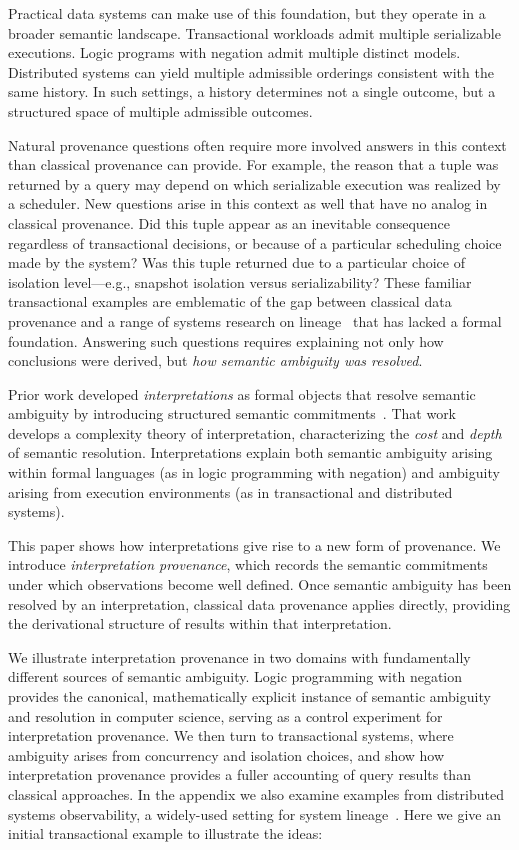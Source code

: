 \documentclass[acmsmall,nonacm]{acmart}
\theoremstyle{remark}
\numberwithin{definition}{section}
\numberwithin{theorem}{section}
\numberwithin{lemma}{section}
\numberwithin{corollary}{section}
\numberwithin{remark}{section}
\numberwithin{example}{section}
\numberwithin{observation}{section}
\numberwithin{assumption}{section}
\begin{document}
Practical data systems can make use of this foundation, but they operate in a
broader semantic landscape.
Transactional workloads admit multiple serializable executions.
Logic programs with negation admit multiple distinct models.
Distributed systems can yield multiple admissible orderings consistent with the same
history.
In such settings, a history determines not a single outcome, but a structured
space of multiple admissible outcomes.

Natural provenance questions often require more involved answers in this context
than classical provenance can provide.
For example, the reason that a tuple was
returned by a query may depend on which serializable execution was realized by a scheduler.
New questions arise in this context as well that have no analog in classical provenance.
Did this tuple appear as an inevitable consequence regardless of transactional decisions,
or because of a particular scheduling choice made by the system?
Was this tuple returned due to a particular choice of isolation
level---e.g., snapshot isolation versus serializability?
These familiar transactional examples are emblematic of the gap between classical data provenance and a range of
systems research on 
lineage~\cite{sigelman2010dapper,seltzer2005provenance,bates2015trustworthy}
that has lacked a formal foundation.
Answering such questions requires explaining not only how conclusions were derived,
but \emph{how semantic ambiguity was resolved}.

Prior work developed
\emph{interpretations} as formal objects that resolve semantic ambiguity by
introducing structured semantic commitments~\cite{hellerstein2026interpretation}.
That work develops a complexity theory of interpretation, characterizing the
\emph{cost} and \emph{depth} of semantic resolution.
Interpretations explain both semantic ambiguity arising within formal languages
(as in logic programming with negation) and ambiguity arising from execution
environments (as in transactional and distributed systems).

This paper shows how interpretations give rise to a new form of provenance.
We introduce \emph{interpretation provenance}, which records the semantic
commitments under which observations become well defined.
Once semantic ambiguity has been resolved by an interpretation, classical data
provenance applies directly, providing the derivational structure of results
within that interpretation.

We illustrate interpretation provenance in two domains with fundamentally different
sources of semantic ambiguity.
Logic programming with negation provides the canonical, mathematically explicit
instance of semantic ambiguity and resolution in computer science, serving as a
control experiment for interpretation provenance.
We then turn to transactional systems, where ambiguity arises from concurrency and
isolation choices, and show how interpretation provenance provides a fuller
accounting of query results than classical approaches. In the appendix we also examine
examples from distributed systems observability, a widely-used setting for system
lineage~\cite{sigelman2010dapper}. 
Here we give an initial transactional example to
illustrate the ideas:
\end{document}
